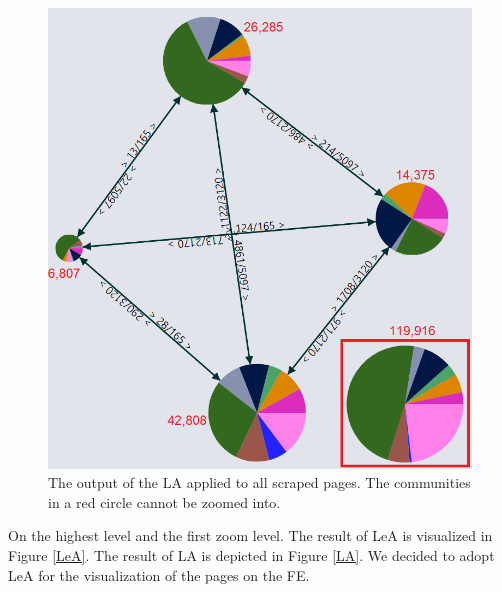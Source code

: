 \begin{figure}[ht]
    \centering
    \includegraphics[width =\textwidth]{Images/LeA.png}
    \caption{ The output of the LA applied to all scraped pages. The communities in a red circle cannot be zoomed into.}
    \label{LeAFigure}
\end{figure}
On the highest level and the first zoom level. The result of LeA is visualized in Figure \ref{LeA}. The result of LA is depicted in Figure \ref{LA}.
We decided to adopt LeA for the visualization of the pages on the FE. 

